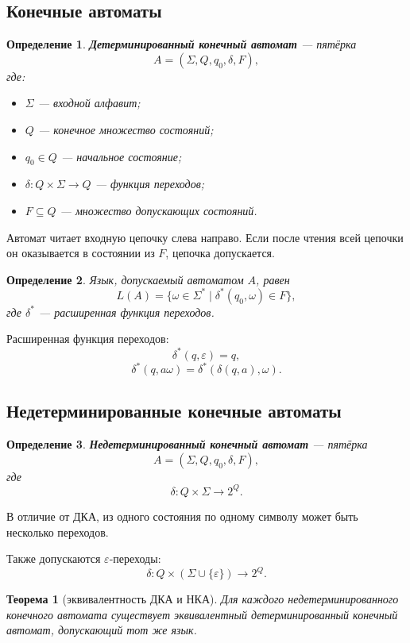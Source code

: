 \documentclass[12pt,a4paper]{article}
\newtheorem{definition}{Определение}
\newtheorem{theorem}{Теорема}
\newcommand{\eps}{\varepsilon}
\begin{document}
\subsection{Конечные автоматы}

\begin{definition}
\textbf{Детерминированный конечный автомат} --- пятёрка
\[
A=(\Sigma,Q,q_0,\delta,F),
\]
где:
\begin{itemize}
    \item $\Sigma$ --- входной алфавит;
    \item $Q$ --- конечное множество состояний;
    \item $q_0\in Q$ --- начальное состояние;
    \item $\delta:Q\times \Sigma\to Q$ --- функция переходов;
    \item $F\subseteq Q$ --- множество допускающих состояний.
\end{itemize}
\end{definition}

Автомат читает входную цепочку слева направо. Если после чтения всей цепочки он оказывается в состоянии из $F$, цепочка допускается.

\begin{definition}
Язык, допускаемый автоматом $A$, равен
\[
L(A)=\{\omega\in\Sigma^*\mid \delta^*(q_0,\omega)\in F\},
\]
где $\delta^*$ --- расширенная функция переходов.
\end{definition}

Расширенная функция переходов:
\[
\delta^*(q,\eps)=q,
\]
\[
\delta^*(q,a\omega)=\delta^*(\delta(q,a),\omega).
\]

\subsection{Недетерминированные конечные автоматы}

\begin{definition}
\textbf{Недетерминированный конечный автомат} --- пятёрка
\[
A=(\Sigma,Q,q_0,\delta,F),
\]
где
\[
\delta:Q\times\Sigma\to 2^Q.
\]
\end{definition}

В отличие от ДКА, из одного состояния по одному символу может быть несколько переходов.

Также допускаются $\eps$-переходы:
\[
\delta:Q\times(\Sigma\cup\{\eps\})\to 2^Q.
\]

\begin{theorem}[эквивалентность ДКА и НКА]
Для каждого недетерминированного конечного автомата существует эквивалентный детерминированный конечный автомат, допускающий тот же язык.
\end{theorem}
\end{document}
